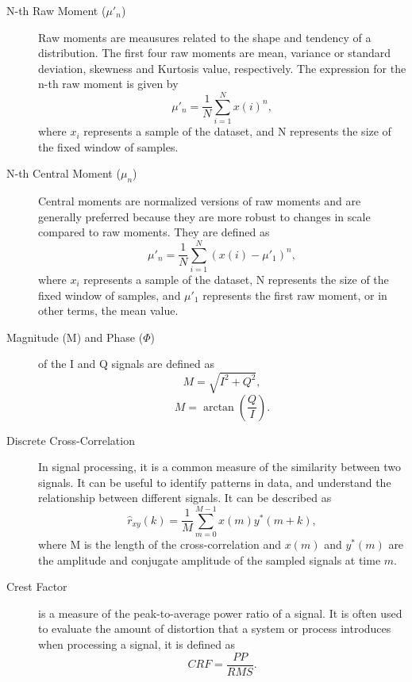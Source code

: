 \begin{description}
    \item[N-th Raw Moment ($\mu'_n$)]  
    Raw moments are meausures related to the shape and tendency of a distribution. The first four raw moments are mean, variance or standard deviation, skewness and Kurtosis value, respectively. The expression for the n-th raw moment is given by
     \begin{equation} \label{eq:nRawMoment}
     \mu'_n =  \frac{1}{N} \sum_{i=1}^{N} x(i)^n,
     \end{equation}    
    where $x_i$ represents a sample of the dataset, and N represents the size of the fixed window of samples.
    
    \item[N-th Central Moment ($\mu_n$)]  
    Central moments are normalized versions of raw moments and are generally preferred because they are more robust to changes in scale compared to raw moments. They are defined as
     \begin{equation} \label{eq:nCentralMoment}
     \mu'_n =  \frac{1}{N} \sum_{i=1}^{N} (x(i)- \mu'_1)^n ,
     \end{equation}    
    where $x_i$ represents a sample of the dataset, N represents the size of the fixed window of samples, and $\mu'_1$ represents the first raw moment, or in other terms, the mean value.
    
    \item[Magnitude (M) and Phase ($\Phi$)]  
    of the \gls{I} and \gls{Q} signals are defined as 
    \begin{equation} \label{eq:magnitude}
     M = \sqrt{I^2 + Q^2},
    \end{equation}
    \begin{equation} \label{eq:phase}
     M = \arctan \left(\frac{Q}{I}\right).
    \end{equation}

    \item[Discrete Cross-Correlation]  
    In signal processing, it is a common measure of the similarity between two signals. It can be useful to identify patterns in data, and understand the relationship between different signals. It can be described as
    \begin{equation} \label{eq:crossCorrelation}
     \hat{r}_{xy}(k) = \frac{1}{M} \sum_{m=0}^{M-1} x(m) y^*(m+k),
    \end{equation}
     where M is the length of the cross-correlation and $x(m)$ and $y^*(m)$ are the amplitude and conjugate amplitude of the sampled signals at time $m$.
    
    \item[Crest Factor] is a measure of the peak-to-average power ratio of a signal. It is often used to evaluate the amount of distortion that a system or process introduces when processing a signal, it is defined as
    \begin{equation} \label{eq:crest factor}
     CRF = \frac{PP  }{RMS  }.
    \end{equation}


\end{description}


